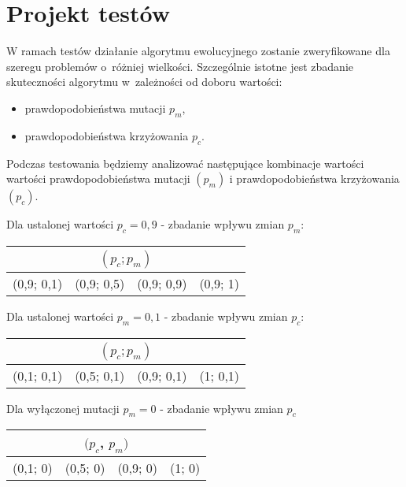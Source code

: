 \documentclass[12pt, a4paper]{article}
\begin{document}
\section{Projekt testów}
W ramach testów działanie algorytmu ewolucyjnego zostanie zweryfikowane dla szeregu problemów o~różniej wielkości. Szczególnie istotne jest zbadanie skuteczności algorytmu w~zależności od doboru wartości:
\begin{itemize}
	\item prawdopodobieństwa mutacji $p_m$,
	\item prawdopodobieństwa krzyżowania $p_c$.
\end{itemize}

Podczas testowania będziemy analizować następujące kombinacje wartości wartości prawdopodobieństwa mutacji $(p_m)$ i prawdopodobieństwa krzyżowania $(p_c)$.

\bigskip

Dla ustalonej wartości $p_c = 0,9$ - zbadanie wpływu zmian $p_m$:
\begin{center}
\begin{tabular}{|l|l|l|l|}
\hline
\multicolumn{4}{|c|}{$(p_c; p_m)$} \\
\hline
(0,9; 0,1) & (0,9; 0,5) & (0,9; 0,9) & (0,9; 1)\\
\hline
\end{tabular}
\end{center}

\bigskip

Dla ustalonej wartości $p_m = 0,1$ - zbadanie wpływu zmian $p_c$:
\begin{center}
\begin{tabular}{|l|l|l|l|}
\hline
\multicolumn{4}{|c|}{$(p_c; p_m)$} \\
\hline
(0,1; 0,1) & (0,5; 0,1) & (0,9; 0,1) & (1; 0,1)\\
\hline
\end{tabular}
\end{center}

\bigskip

Dla wyłączonej mutacji $p_m = 0$ - zbadanie wpływu zmian $p_c$
\begin{center}
\begin{tabular}{|l|l|l|l|}
\hline
\multicolumn{4}{|c|}{$(p_c$, $p_m)$} \\
\hline
(0,1; 0) & (0,5; 0) & (0,9; 0) & (1; 0)\\
\hline
\end{tabular}
\end{center}
\end{document}
